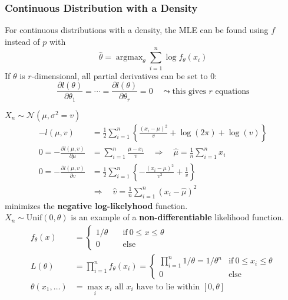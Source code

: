 \subsubsection{Continuous Distribution with a Density}
For continuous distributions with a density, the MLE can be found using $f$ instead of $p$ with
\noindent\begin{equation*}
    \widehat{\theta}=\operatorname{argmax}_\theta\sum_{i=1}^n\log f_\theta(x_i)
\end{equation*}
If $\theta$ is $r$-dimensional, all partial derivatives can be set to 0:
\noindent\begin{equation*}
    \frac{\partial l(\theta)}{\partial\theta_1}=\cdots=\frac{\partial l(\theta)}{\partial\theta_r}=0\quad\leadsto\text{this gives }r\text{ equations}
\end{equation*}

\begin{examplesection}[Examples]
    $X_n\sim\mathcal{N}(\mu,\sigma^2=v)$
    \noindent\begin{align*}
        -l(\mu,v)                                & =\frac12\sum_{i=1}^n\left\{\frac{{(x_i-\mu)}^2}v+\log(2\pi)+\log(v)\right\}         \\
        0=-\frac{\partial l(\mu,v)}{\partial\mu} & =\sum_{i=1}^n\frac{\mu-x_i}v\quad\Rightarrow\quad \widehat{\mu}=\frac1n\sum_{i=1}^n x_i \\
        0=-\frac{\partial l(\mu,v)}{\partial v}  & =\frac12\sum_{i=1}^n\left\{-\frac{{(x_i-\mu)}^2}{v^2}+\frac1v\right\}               \\
                                                 & \Rightarrow\quad\widehat{v}=\frac1n\sum_{i=1}^n{(x_i-\widehat{\mu})}^2
    \end{align*}
    minimizes the \textbf{negative log-likelyhood} function.\\
    $X_n\sim \mathrm{Unif}(0,\theta)$ is an example of a \textbf{non-differentiable} likelihood function.
    \noindent\begin{align*}
        f_\theta(x)        & =\begin{cases}
                                  1/\theta & \quad\mathrm{if~}0\leq x\leq\theta \\
                                  0        & \quad\mathrm{else}
                              \end{cases}                                                  \\
        L(\theta)          & =\prod_{i=1}^n f_\theta(x_i)=\begin{cases}
                                                              \prod_{i=1}^n1/\theta=1/\theta^n & \mathrm{if~}0\leq x_i\leq\theta \\
                                                              0                                & \mathrm{else}
                                                          \end{cases} \\
        \theta(x_1,\ldots) & =\max_i x_i \text{ all } x_i \text{ have to lie within } [0,\theta]
    \end{align*}
\end{examplesection}

